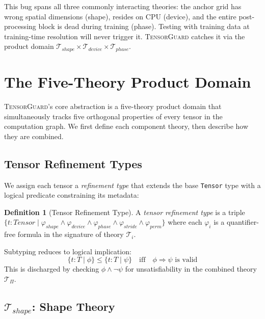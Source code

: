 \documentclass[10pt]{article}
\newcommand{\tguard}{\textsc{TensorGuard}}
\newcommand{\Tshape}{\mathcal{T}_{\mathit{shape}}}
\newcommand{\Tdevice}{\mathcal{T}_{\mathit{device}}}
\newcommand{\Tphase}{\mathcal{T}_{\mathit{phase}}}
\newcommand{\Tprod}{\mathcal{T}_{\Pi}}
\theoremstyle{plain}
\theoremstyle{definition}
\newtheorem{definition}[theorem]{Definition}
\theoremstyle{remark}
\begin{document}
This bug spans all three commonly interacting theories: the anchor
grid has wrong spatial dimensions (shape), resides on CPU (device),
and the entire post-processing block is dead during training (phase).
Testing with training data at training-time resolution will never
trigger it.  \tguard{} catches it via the product domain
$\Tshape \times \Tdevice \times \Tphase$.


\section{The Five-Theory Product Domain}\label{sec:theory}

\tguard{}'s core abstraction is a five-theory product domain
that simultaneously tracks five orthogonal properties of every tensor
in the computation graph.  We first define each component theory, then
describe how they are combined.

\subsection{Tensor Refinement Types}

We assign each tensor a \emph{refinement type} that extends the base
\texttt{Tensor} type with a logical predicate constraining its
metadata:

\begin{definition}[Tensor Refinement Type]\label{def:reftype}
A \emph{tensor refinement type} is a triple
$\{t : \mathit{Tensor} \mid \varphi_{\mathit{shape}} \land
  \varphi_{\mathit{device}} \land \varphi_{\mathit{phase}} \land
  \varphi_{\mathit{stride}} \land \varphi_{\mathit{perm}}\}$
where each $\varphi_i$ is a quantifier-free formula in the
signature of theory $\mathcal{T}_i$.
\end{definition}

Subtyping reduces to logical implication:
\[
  \{t : T \mid \phi\} \leq \{t : T \mid \psi\}
  \quad\text{iff}\quad
  \phi \Rightarrow \psi \text{ is valid}
\]
This is discharged by checking $\phi \land \neg\psi$ for
unsatisfiability in the combined theory $\Tprod$.

\subsection{$\Tshape$: Shape Theory}\label{sec:tshape}
\end{document}
